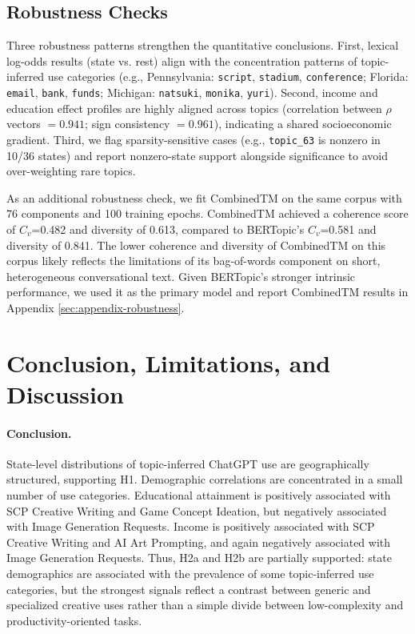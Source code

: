 \documentclass[11pt]{article}
\begin{document}
\subsection{Robustness Checks}
Three robustness patterns strengthen the quantitative conclusions. First, lexical log-odds results (state vs. rest) align with the concentration patterns of topic-inferred use categories (e.g., Pennsylvania: \texttt{script}, \texttt{stadium}, \texttt{conference}; Florida: \texttt{email}, \texttt{bank}, \texttt{funds}; Michigan: \texttt{natsuki}, \texttt{monika}, \texttt{yuri}). Second, income and education effect profiles are highly aligned across topics (correlation between $\rho$ vectors $=0.941$; sign consistency $=0.961$), indicating a shared socioeconomic gradient. Third, we flag sparsity-sensitive cases (e.g., \texttt{topic\_63} is nonzero in 10/36 states) and report nonzero-state support alongside significance to avoid over-weighting rare topics.

As an additional robustness check, we fit CombinedTM \citep{bianchi2021pretraining} on the same corpus with 76 components and 100 training epochs. CombinedTM achieved a coherence score of $C_v$=0.482 and diversity of 0.613, compared to BERTopic's $C_v$=0.581 and diversity of 0.841. The lower coherence and diversity of CombinedTM on this corpus likely reflects the limitations of its bag-of-words component on short, heterogeneous conversational text. Given BERTopic's stronger intrinsic performance, we used it as the primary model and report CombinedTM results in Appendix \ref{sec:appendix-robustness}.

\section{Conclusion, Limitations, and Discussion}
\label{sec:conclusion}

\paragraph{Conclusion.}
State-level distributions of topic-inferred ChatGPT use are geographically structured, supporting H1. Demographic correlations are concentrated in a small number of use categories. Educational attainment is positively associated with SCP Creative Writing and Game Concept Ideation, but negatively associated with Image Generation Requests. Income is positively associated with SCP Creative Writing and AI Art Prompting, and again negatively associated with Image Generation Requests. Thus, H2a and H2b are partially supported: state demographics are associated with the prevalence of some topic-inferred use categories, but the strongest signals reflect a contrast between generic and specialized creative uses rather than a simple divide between low-complexity and productivity-oriented tasks.
\end{document}
